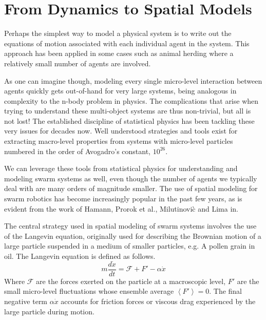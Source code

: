 \documentclass[Main.tex]{subfiles}
\begin{document}
\section{From Dynamics to Spatial Models}
Perhaps the simplest way to model a physical system is to write out the equations of motion associated with each individual agent in the system. This approach has been applied in some cases such as animal herding\cite{Correll2008b} where a relatively small number of agents are involved. 

As one can imagine though, modeling every single micro-level interaction between agents quickly gets out-of-hand for very large systems, being analogous in complexity to the n-body problem in physics. The complications that arise when trying to understand these multi-object systems are thus non-trivial, but all is not lost! The established discipline of statistical physics has been tackling these very issues for decades now. Well understood strategies and tools exist for extracting macro-level properties from systems with micro-level particles numbered in the order of Avogadro's constant, $10^{26}$.

We can leverage these tools from statistical physics for understanding and modeling swarm systems as well, even though the number of agents we typically deal with are many orders of magnitude smaller. The use of spatial modeling for swarm robotics has become increasingly popular in the past few years, as is evident from the work of Hamann\cite{Hamann2008, Hamann2010}, Prorok et al.\cite{Prorok2011}, Milutinovi\`{c} and Lima in\cite{Milutinovi2006}.

The central strategy used in spatial modeling of swarm systems involves the use of the Langevin equation, originally used for describing the Brownian motion of a large particle suspended in a medium of smaller particles, e.g. A pollen grain in oil. The Langevin equation is defined as follows\cite{Reif1965}.
\begin{equation}
	m \frac{d\dot{x}}{dt} = \mathcal{F} + F' - \alpha\dot{x}
\end{equation}
Where $\mathcal{F}$ are the forces exerted on the particle at a macroscopic level, $F'$ are the small micro-level fluctuations whose ensemble average $\left<F'\right> = 0$. The final negative term $\alpha\dot{x}$ accounts for friction forces or viscous drag experienced by the large particle during motion.

\end{document}
